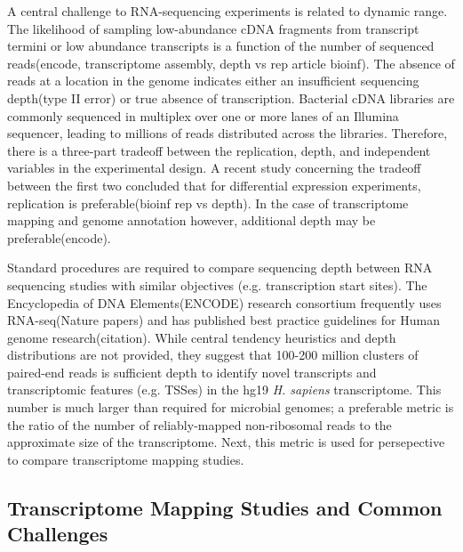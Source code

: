 A central challenge to RNA-sequencing experiments is related to dynamic range. The likelihood of sampling low-abundance cDNA fragments from transcript termini or low abundance transcripts is a function of the number of sequenced reads(encode, transcriptome assembly, depth vs rep article bioinf). The absence of reads at a location in the genome indicates either an insufficient sequencing depth(type II error) or true absence of transcription. Bacterial cDNA libraries are commonly sequenced in multiplex over one or more lanes of an Illumina sequencer, leading to millions of reads distributed across the libraries. Therefore, there is a three-part tradeoff between the replication, depth, and independent variables in the experimental design. A recent study concerning the tradeoff between the first two concluded that for differential expression experiments, replication is preferable(bioinf rep vs depth). In the case of transcriptome mapping and genome annotation however, additional depth may be preferable(encode).

Standard procedures are required to compare sequencing depth between RNA sequencing studies with similar objectives (e.g. transcription start sites). The Encyclopedia of DNA Elements(ENCODE) research consortium frequently uses RNA-seq(Nature papers) and has published best practice guidelines for Human genome research(citation). While central tendency heuristics and depth distributions are not provided, they suggest that 100-200 million clusters of paired-end reads is sufficient depth to identify novel transcripts and transcriptomic features (e.g. TSSes) in the hg19 \textit{H. sapiens} transcriptome. This number is much larger than required for microbial genomes; a preferable metric is the ratio of the number of reliably-mapped non-ribosomal reads to the approximate size of the transcriptome. Next, this metric is used for persepective to compare transcriptome mapping studies.

\subsection{Transcriptome Mapping Studies and Common Challenges}

